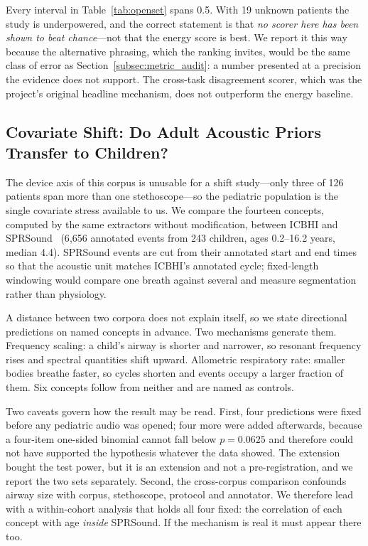 \documentclass[journal,onecolumn]{IEEEtran}
\begin{document}
Every interval in Table~\ref{tab:openset} spans 0.5. With 19 unknown patients the
study is underpowered, and the correct statement is that \emph{no scorer here has
been shown to beat chance}---not that the energy score is best. We report it this way
because the alternative phrasing, which the ranking invites, would be the same class
of error as Section~\ref{subsec:metric_audit}: a number presented at a precision the
evidence does not support. The cross-task disagreement scorer, which was the
project's original headline mechanism, does not outperform the energy baseline.

\subsection{Covariate Shift: Do Adult Acoustic Priors Transfer to Children?}
\label{subsec:pediatric}

The device axis of this corpus is unusable for a shift study---only three of 126
patients span more than one stethoscope---so the pediatric population is the single
covariate stress available to us. We compare the fourteen concepts, computed by the
same extractors without modification, between ICBHI and SPRSound~\cite{zhang2022sprsound}
(6{,}656 annotated events from 243 children, ages 0.2--16.2 years, median 4.4).
SPRSound events are cut from their annotated start and end times so that the acoustic
unit matches ICBHI's annotated cycle; fixed-length windowing would compare one breath
against several and measure segmentation rather than physiology.

A distance between two corpora does not explain itself, so we state directional
predictions on named concepts in advance. Two mechanisms generate them. Frequency
scaling: a child's airway is shorter and narrower, so resonant frequency rises and
spectral quantities shift upward. Allometric respiratory rate: smaller bodies breathe
faster, so cycles shorten and events occupy a larger fraction of them. Six concepts
follow from neither and are named as controls.

Two caveats govern how the result may be read. First, four predictions were fixed
before any pediatric audio was opened; four more were added afterwards, because a
four-item one-sided binomial cannot fall below $p=0.0625$ and therefore could not have
supported the hypothesis whatever the data showed. The extension bought the test power,
but it is an extension and not a pre-registration, and we report the two sets
separately. Second, the cross-corpus comparison confounds airway size with corpus,
stethoscope, protocol and annotator. We therefore lead with a within-cohort analysis
that holds all four fixed: the correlation of each concept with age \emph{inside}
SPRSound. If the mechanism is real it must appear there too.
\end{document}
